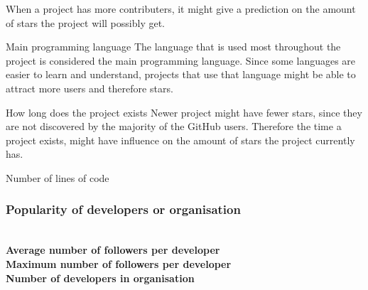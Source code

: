\begin{LaTeXdescription}
        When a project has more contributers, it might give a prediction on the amount of stars the project will possibly get.
        \item[Main programming language]
        The language that is used most throughout the project is considered the main programming language. 
        Since some languages are easier to learn and understand, projects that use that language might be able to attract more users and therefore stars.
        \item[How long does the project exists]
        Newer project might have fewer stars, since they are not discovered by the majority of the GitHub users. 
        Therefore the time a project exists, might have influence on the amount of stars the project currently has.
        \item[Number of lines of code] 
    \end{LaTeXdescription}


    \subsubsection{Popularity of developers or organisation}
    \\
    \textbf{Average number of followers per developer}\\
    \textbf{Maximum number of followers per developer}\\
    \textbf{Number of developers in organisation}\\



